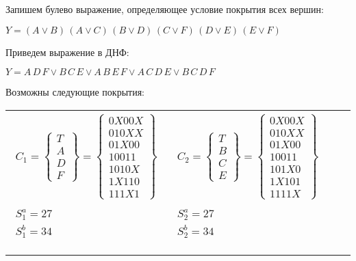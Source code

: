 \documentclass{article}
\begin{document}
Запишем булево выражение, определяющее условие покрытия всех вершин:

$Y = \left(A \lor B\right) \, \left(A \lor C\right) \, \left(B \lor D\right) \, \left(C \lor F\right) \, \left(D \lor E\right) \, \left(E \lor F\right)$

Приведем выражение в ДНФ:

$Y = A \, D \, F \lor B \, C \, E \lor A \, B \, E \, F \lor A \, C \, D \, E \lor B \, C \, D \, F$

Возможны следующие покрытия:
\begin{center}\begin{tabular}{cccc}
$\begin{array}{c}
C_{1} = \begin{Bmatrix} T\\ A\\ D\\ F\end{Bmatrix} = \begin{Bmatrix}0X00X\\010XX\\01X00\\10011\\ 1010X\\ 1X110\\ 111X1\end{Bmatrix} \\ \\
S^a_{1} = 27 \\
S^b_{1} = 34 \\ \phantom{0}
\end{array}$
 & $\begin{array}{c}
C_{2} = \begin{Bmatrix} T\\ B\\ C\\ E\end{Bmatrix} = \begin{Bmatrix}0X00X\\010XX\\01X00\\10011\\ 101X0\\ 1X101\\ 1111X\end{Bmatrix} \\ \\
S^a_{2} = 27 \\
S^b_{2} = 34 \\ \phantom{0}
\end{array}$

\end{tabular}
\end{center}
\end{document}
